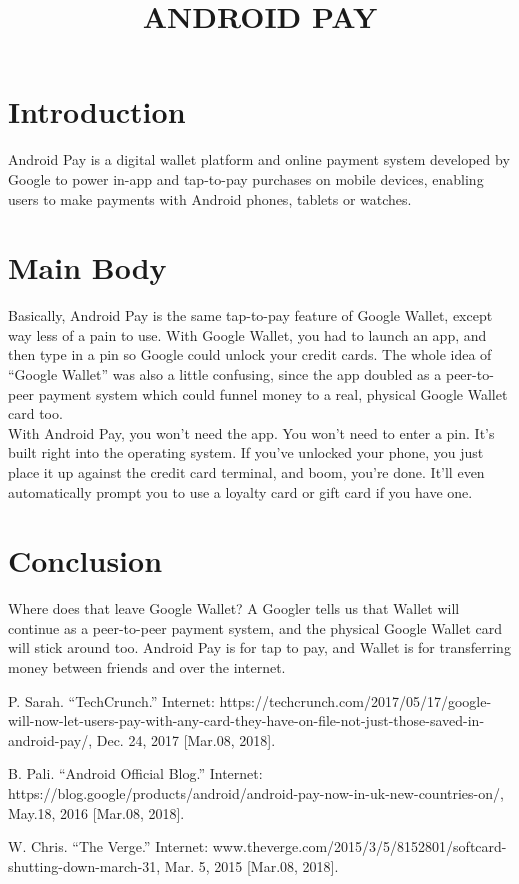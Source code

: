\documentclass[12]{article}
\begin{document}
\pagestyle{empty}
\title{\textbf{ ANDROID PAY}}
\date{}
\maketitle

\section{Introduction}
Android Pay is a digital wallet platform and online payment system developed by Google to power in-app and tap-to-pay purchases on mobile devices, enabling users to make payments with Android phones, tablets or watches.\\
\section{Main Body}
Basically, Android Pay is the same tap-to-pay feature of Google Wallet, except way less of a pain to use. With Google Wallet, you had to launch an app, and then type in a pin so Google could unlock your credit cards. The whole idea of “Google Wallet” was also a little confusing, since the app doubled as a peer-to-peer payment system which could funnel money to a real, physical Google Wallet card too.\\
With Android Pay, you won’t need the app. You won’t need to enter a pin. It’s built right into the operating system. If you’ve unlocked your phone, you just place it up against the credit card terminal, and boom, you’re done. It’ll even automatically prompt you to use a loyalty card or gift card if you have one.
\section{Conclusion}
Where does that leave Google Wallet? A Googler tells us that Wallet will continue as a peer-to-peer payment system, and the physical Google Wallet card will stick around too. Android Pay is for tap to pay, and Wallet is for transferring money between friends and over the internet.

\begin{thebibliography}{}
P. Sarah. “TechCrunch.” Internet: https://techcrunch.com/2017/05/17/google-will-now-let-users-pay-with-any-card-they-have-on-file-not-just-those-saved-in-android-pay/, Dec. 24, 2017 [Mar.08, 2018].

B. Pali. “Android Official Blog.” Internet: https://blog.google/products/android/android-pay-now-in-uk-new-countries-on/, May.18, 2016 [Mar.08, 2018].

W. Chris. “The Verge.” Internet: www.theverge.com/2015/3/5/8152801/softcard-shutting-down-march-31, Mar. 5, 2015 [Mar.08, 2018].
\end{thebibliography}
\end{document}
